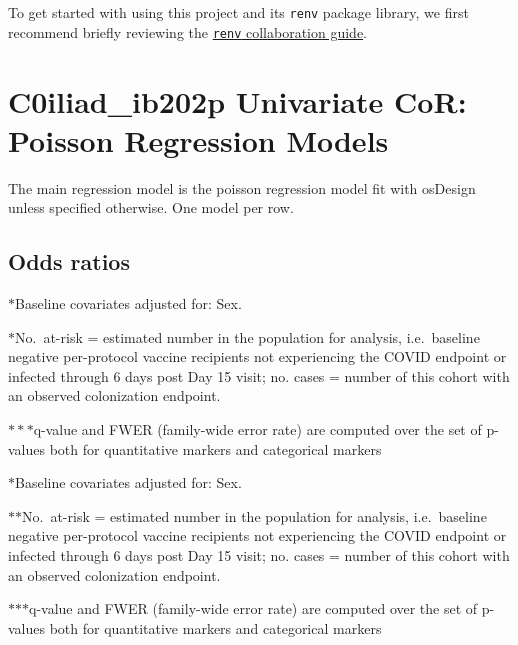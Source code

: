 \documentclass[]{book}
\begin{document}
To get started with using this project and its \texttt{renv} package library, we
first recommend briefly reviewing the \href{https://rstudio.github.io/renv/articles/collaborating.html}{\texttt{renv} collaboration
guide}.

\hypertarget{c0iliad_ib202p-univariate-cor-poisson-regression-models}{%
\chapter{C0iliad\_ib202p Univariate CoR: Poisson Regression Models}\label{c0iliad_ib202p-univariate-cor-poisson-regression-models}}

The main regression model is the poisson regression model fit with osDesign unless specified otherwise. One model per row.

\hypertarget{odds-ratios}{%
\section{Odds ratios}\label{odds-ratios}}

\setlength{\tabcolsep}{.5ex}
  

\(\ast\)Baseline covariates adjusted for: Sex.

\(\ast\)No.~at-risk = estimated number in the population for analysis, i.e.~baseline negative per-protocol vaccine recipients not experiencing the COVID endpoint or infected through 6 days post Day 15 visit; no. cases = number of this cohort with an observed colonization endpoint.

\(\ast\ast\ast\)q-value and FWER (family-wide error rate) are computed over the set of p-values both for quantitative markers and categorical markers

\clearpage
\setlength{\tabcolsep}{.5ex}
  

\(\ast\)Baseline covariates adjusted for: Sex.

\(\ast\)\(\ast\)No.~at-risk = estimated number in the population for analysis, i.e.~baseline negative per-protocol vaccine recipients not experiencing the COVID endpoint or infected through 6 days post Day 15 visit; no. cases = number of this cohort with an observed colonization endpoint.

\(\ast\)\(\ast\)\(\ast\)q-value and FWER (family-wide error rate) are computed over the set of p-values both for quantitative markers and categorical markers
\end{document}
